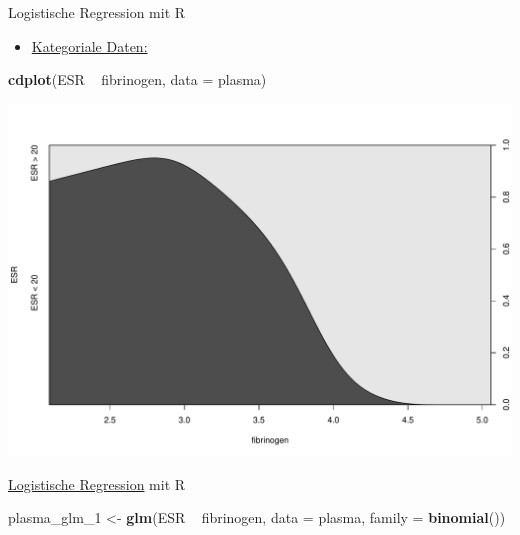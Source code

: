 \documentclass[ignorenonframetext,]{beamer}
\newenvironment{Shaded}{}{}
\newcommand{\KeywordTok}[1]{\textcolor[rgb]{0.00,0.44,0.13}{\textbf{{#1}}}}
\newcommand{\DataTypeTok}[1]{\textcolor[rgb]{0.56,0.13,0.00}{{#1}}}
\newcommand{\StringTok}[1]{\textcolor[rgb]{0.25,0.44,0.63}{{#1}}}
\newcommand{\NormalTok}[1]{{#1}}
\providecommand{\tightlist}{%
\setlength{\itemsep}{0pt}\setlength{\parskip}{0pt}}
\begin{document}
\begin{frame}[fragile]{Logistische Regression mit R}

\begin{itemize}
\tightlist
\item
  \href{http://homepage.univie.ac.at/herbert.nagel/KategorialeDaten.pdf}{Kategoriale
  Daten:}
\end{itemize}

\begin{Shaded}
\begin{Highlighting}[]
\KeywordTok{cdplot}\NormalTok{(ESR ~}\StringTok{ }\NormalTok{fibrinogen, }\DataTypeTok{data =} \NormalTok{plasma)}
\end{Highlighting}
\end{Shaded}

\includegraphics{RSocialScience2_files/figure-beamer/unnamed-chunk-96-1.pdf}

\end{frame}

\begin{frame}[fragile]{\href{http://ww2.coastal.edu/kingw/statistics/R-tutorials/logistic.html}{Logistische
Regression} mit R}

\begin{Shaded}
\begin{Highlighting}[]
\NormalTok{plasma_glm_1 <-}\StringTok{ }\KeywordTok{glm}\NormalTok{(ESR ~}\StringTok{ }\NormalTok{fibrinogen, }\DataTypeTok{data =} \NormalTok{plasma, }
                    \DataTypeTok{family =} \KeywordTok{binomial}\NormalTok{())}
\end{Highlighting}
\end{Shaded}

\end{frame}
\end{document}
